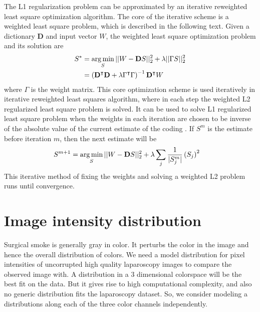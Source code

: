 The L1 regularization problem can be approximated by an iterative reweighted least square optimization algorithm. The core of the iterative scheme is a weighted least square problem, which is described in the following text. Given a dictionary $\mathbf{D}$ and input vector $W$, the weighted least square optimization problem and its solution are
\begin{align}
    S^* &= \operatorname*{arg\,min}_{S} || W - \mathbf{D} S ||_2^2 + \lambda || \Gamma S ||_2^2 \label{eqn:wls}\\
    &= \left( \mathbf{D}^\intercal \mathbf{D} + \lambda \Gamma^\intercal \Gamma \right)^{-1} \mathbf{D}^\intercal W \label{eqn:wlsSolution}
\end{align}
where $\Gamma$ is the weight matrix. This core optimization scheme is used iteratively in iterative reweighted least squares algorithm, where in each step the weighted L2 regularized least square problem is solved. It can be used to solve L1 regularized least square problem when the weights in each iteration are chosen to be inverse of the absolute value of the current estimate of the coding \cite{chartrand2008iteratively}. If $S^m$ is the estimate before iteration $m$, then the next estimate will be
\begin{align}
    S^{m+1} &= \operatorname*{arg\,min}_{S} || W - \mathbf{D} S ||_2^2 + \lambda \sum_{j} \frac{1}{| S_j^m |} \left( S_j \right)^2 \label{eqn:irls_l1} 
\end{align}
This iterative method of fixing the weights and solving a weighted L2 problem runs until convergence.



\section{Image intensity distribution}
\label{sec:pcaDist}
Surgical smoke is generally gray in color. It perturbs the color in the image and hence the overall distribution of colors. We need a model distribution for pixel intensities of uncorrupted high quality laparoscopy images to compare the observed image with. A distribution in a 3 dimensional colorspace will be the best fit on the data. But it gives rise to high computational complexity, and also no generic distribution fits the laparoscopy dataset. So, we consider modeling a distributions along each of the three color channels independently.

